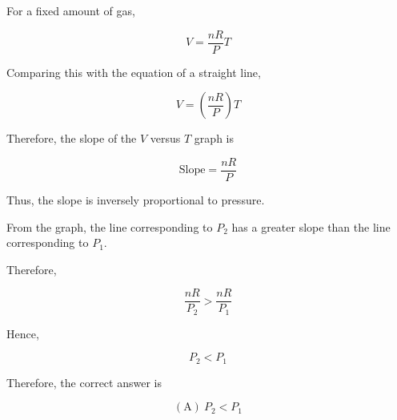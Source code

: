 \documentclass[12pt]{article}
\begin{document}
For a fixed amount of gas,

\begin{equation*}
V=\frac{nR}{P}T
\end{equation*}

Comparing this with the equation of a straight line,

\begin{equation*}
V=\left(\frac{nR}{P}\right)T
\end{equation*}

Therefore, the slope of the $V$ versus $T$ graph is

\begin{equation*}
\text{Slope}=\frac{nR}{P}
\end{equation*}

Thus, the slope is inversely proportional to pressure.

From the graph, the line corresponding to $P_2$ has a greater slope than the line corresponding to $P_1$.

Therefore,

\begin{equation*}
\frac{nR}{P_2}>\frac{nR}{P_1}
\end{equation*}

Hence,

\begin{equation*}
P_2<P_1
\end{equation*}

Therefore, the correct answer is

\begin{equation*}
\boxed{\mathrm{(A)}\ P_2<P_1}
\end{equation*}
\end{document}
